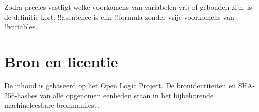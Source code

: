 \documentclass[openany]{memoir}
\begin{document}
Zodra precies vastligt welke voorkomens van variabelen vrij of
gebonden zijn, is de definitie kort: !!a{sentence} is elke !!{formula}
zonder vrije voorkomens van !!{variable}s.
\endgroup
\OLEndChapterHook
\OLEndPartHook

\clearpage
\chapter*{Bron en licentie}
De inhoud is gebaseerd op het Open Logic Project. De bronidentiteiten en
SHA-256-hashes van alle opgenomen eenheden staan in het bijbehorende
machineleesbare bronmanifest.


\end{document}
